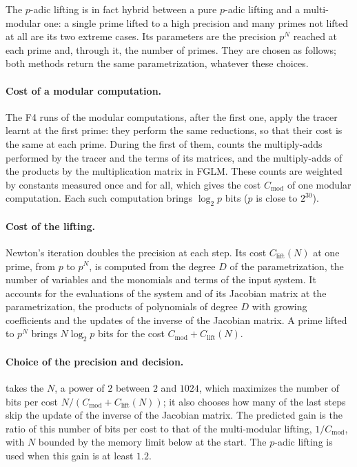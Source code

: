 \documentclass[a4paper,english,11pt]{scrartcl}
\theoremstyle{definition}
\theoremstyle{remark}
\begin{document}
The $p$-adic lifting is in fact hybrid between a pure $p$-adic lifting and
a multi-modular one: a single prime lifted to a high precision and many
primes not lifted at all are its two extreme cases. Its parameters are the
precision $p^N$ reached at each prime and, through it, the number of primes.
They are chosen as follows; both methods return the same parametrization,
whatever these choices.

\paragraph{Cost of a modular computation.} The F4 runs of the modular
computations, after the first one, apply the tracer learnt at the first prime:
they perform the same reductions, so that their cost is the same at each
prime. During the first of them, \msolve counts the multiply-adds performed
by the tracer and the terms of its matrices, and the multiply-adds of the
products by the multiplication matrix in FGLM. These counts are weighted by constants measured once and
for all, which gives the cost $C_{\mathrm{mod}}$ of one modular
computation. Each such computation brings $\log_2 p$ bits ($p$ is close to
$2^{30}$).

\paragraph{Cost of the lifting.} Newton's iteration doubles the precision at
each step. Its cost $C_{\mathrm{lift}}(N)$ at one prime, from $p$ to $p^N$,
is computed from the degree $D$ of the parametrization, the number of
variables and the monomials and terms of the input system. It accounts for
the evaluations of the system and of its Jacobian matrix at the
parametrization, the products of polynomials of degree $D$ with growing
coefficients and the updates of the inverse of the Jacobian matrix. A
prime lifted to $p^N$ brings $N \log_2 p$ bits for the cost
$C_{\mathrm{mod}} + C_{\mathrm{lift}}(N)$.

\paragraph{Choice of the precision and decision.} \msolve takes the $N$, a
power of $2$ between $2$ and $1024$, which maximizes the number of bits per
cost $N / (C_{\mathrm{mod}} + C_{\mathrm{lift}}(N))$; it also chooses how
many of the last steps skip the update of the inverse of the Jacobian
matrix. The predicted gain is the ratio of this number of bits per cost to
that of the multi-modular lifting, $1 / C_{\mathrm{mod}}$, with $N$ bounded
by the memory limit below at the start. The $p$-adic lifting is used when
this gain is at least $1.2$.
\end{document}
